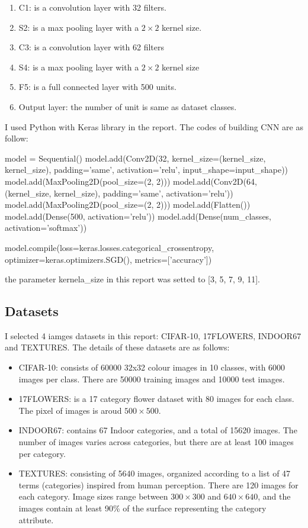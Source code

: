 \documentclass[a4paper,10pt]{article}
\begin{document}
   \begin{enumerate}
      \item  C1: is a convolution layer with 32 filters.
      \item  S2: is a max pooling layer with a $2\times2$ kernel size.
      \item  C3: is a convolution layer with 62 filters
      \item  S4: is a max pooling layer with a $2\times2$ kernel size
      \item  F5: is a full connected layer with 500 units.
      \item  Output layer: the number of unit is same as dataset classes.
  \end{enumerate}
 
I used Python with Keras library in the report. The codes of building CNN are as follow:

\begin{python}
 model = Sequential()
    model.add(Conv2D(32, kernel_size=(kernel_size, kernel_size), padding='same', activation='relu', input_shape=input_shape))
    model.add(MaxPooling2D(pool_size=(2, 2)))
    model.add(Conv2D(64, (kernel_size, kernel_size), padding='same', activation='relu'))
    model.add(MaxPooling2D(pool_size=(2, 2)))
    model.add(Flatten())
    model.add(Dense(500, activation='relu'))
    model.add(Dense(num_classes, activation='softmax'))

    model.compile(loss=keras.losses.categorical_crossentropy, optimizer=keras.optimizers.SGD(), metrics=['accuracy'])
\end{python}

the parameter kernela\_size in this report was setted to [3, 5, 7, 9, 11].

\subsection{Datasets}
I selected 4 iamges datasets in this report: CIFAR-10\cite{krizhevsky2009learning}, 17FLOWERS\cite{Nilsback06}, INDOOR67\cite{quattoni2009recognizing} and TEXTURES\cite{cimpoi14describing}. The details of these datasets are as follows:

   \begin{itemize}
      \item  CIFAR-10: consists of 60000 32x32 colour images in 10 classes, with 6000 images per class. There are 50000 training images and 10000 test images. 
      \item  17FLOWERS: is a 17 category flower dataset with 80 images for each class. The pixel of images is aroud $500 \times 500$.
      \item  INDOOR67: contains 67 Indoor categories, and a total of 15620 images. The number of images varies across categories, but there are at least 100 images per category. 
      \item  TEXTURES: consisting of 5640 images, organized according to a list of 47 terms (categories) inspired from human perception. There are 120 images for each category. Image sizes range between $300\times300$ and $640\times640$, and the images contain at least 90\% of the surface representing the category attribute. 
   \end{itemize}
\end{document}
